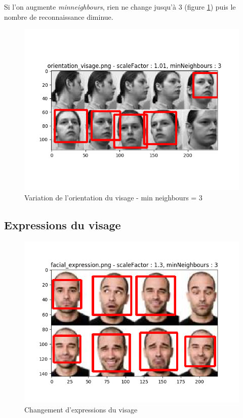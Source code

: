 \documentclass[a4paper,11pt]{article}
\begin{document}
	Si l'on augmente \textit{minneighbours}, rien ne change jusqu'à 3 (figure
	\ref{fig:visage_or2}) puis le nombre de reconnaissance diminue.

	\begin{figure}[H]
	    \begin{center}
		\includegraphics[scale = 0.6]{images/orientation_visage_1,01_3.png}
		\caption{Variation de l'orientation du visage - min neighbours = 3}
		\label{fig:visage_or2}
	    \end{center}
	\end{figure}

    \subsection{Expressions du visage}

	\begin{figure}[H]
	    \begin{center}
		\includegraphics[scale = 0.6]{images/facial_expression_1,3_3.png}
		\caption{Changement d'expressions du visage}
		\label{fig:visage_exp}
	    \end{center}
	\end{figure}
\end{document}
